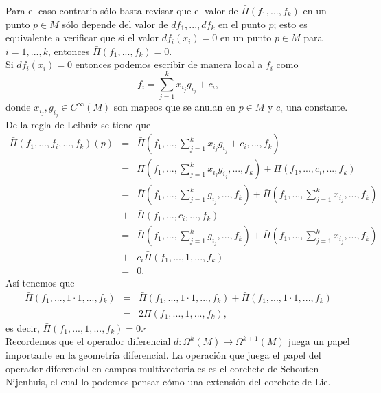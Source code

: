 \documentclass[a4paper,10pt]{book}
\begin{document}
Para el caso contrario s\'olo basta revisar que el valor de $\bar{\Pi}(f_{1},...,f_{k})$ en un punto $p\in M$ s\'olo depende del valor de $df_{1},...,df_{k}$ en el punto $p$; esto es equivalente a verificar que si el valor $df_{i}(x_{i})=0$ en un punto $p\in M$ para $i=1,...,k$, entonces $\bar{\Pi}(f_{1},...,f_{k})=0.$ \\

Si $df_{i}(x_{i})=0$ entonces podemos escribir de manera local a $f_{i}$ como $$f_{i}=\sum\limits_{j=1}^{k}x_{i_{j}}g_{i_{j}}+c_{i},$$
donde $x_{i_{j}},g_{i_{j}}\in C^{\infty}(M)$ son mapeos que se anulan en $p\in M$ y $c_{i}$ una constante.\\

De la regla de Leibniz se tiene que
\begin{eqnarray*}
\bar{\Pi}(f_{1},...,f_{i},...,f_{k})(p) & = &  \bar{\Pi}(f_{1},...,\sum\limits_{j=1}^{k}x_{i_{j}}g_{i_{j}}+c_{i},...,f_{k}) \\
 & = & \bar{\Pi}(f_{1},...,\sum\limits_{j=1}^{k}x_{i_{j}}g_{i_{j}},...,f_{k}) + \bar{\Pi}(f_{1},...,c_{i},...,f_{k}) \\
 & = & \bar{\Pi}(f_{1},...,\sum\limits_{j=1}^{k}g_{i_{j}},...,f_{k}) + \bar{\Pi}(f_{1},...,\sum\limits_{j=1}^{k}x_{i_{j}},...,f_{k}) \\
 & + & \bar{\Pi}(f_{1},...,c_{i},...,f_{k}) \\
 & = & \bar{\Pi}(f_{1},...,\sum\limits_{j=1}^{k}g_{i_{j}},...,f_{k}) + \bar{\Pi}(f_{1},...,\sum\limits_{j=1}^{k}x_{i_{j}},...,f_{k}) \\
 & + & c_{i}\bar{\Pi}(f_{1},...,1,...,f_{k}) \\
 & = & 0.
\end{eqnarray*}
As\'i tenemos que
\begin{eqnarray*}
\bar{\Pi}(f_{1},...,1\cdot 1,...,f_{k})  & =  & \bar{\Pi}(f_{1},...,1\cdot 1,...,f_{k}) +\bar{\Pi}(f_{1},...,1\cdot 1,...,f_{k})\\
& = & 2\bar{\Pi}(f_{1},...,1,...,f_{k}),
\end{eqnarray*}
es decir, $\bar{\Pi}(f_{1},...,1,...,f_{k})=0$.\hfill $\square$\\

Recordemos que el operador diferencial $d:\Omega^{k}(M)\to\Omega^{k+1}(M)$ juega un papel importante en la geometr\'ia diferencial. La operaci\'on que juega el papel del operador diferencial en campos multivectoriales es el corchete de Schouten-Nijenhuis, el cual lo podemos pensar c\'omo una extensi\'on del corchete de Lie.\\
\end{document}
